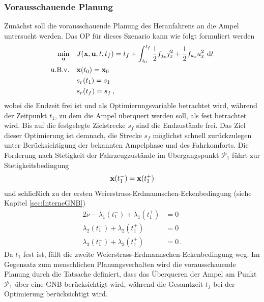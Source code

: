 \subsubsection{Vorausschauende Planung}\label{subsubsec:Vorausschauend}
Zunächst soll die vorausschauende Planung des Heranfahrens an die Ampel untersucht werden. Das \gls{OP} für dieses Szenario kann wie folgt formuliert werden
\begin{align}
\min_{\boldsymbol{\mathrm{u}}} \quad & J(\boldsymbol{\mathrm{x}},\boldsymbol{\mathrm{u}},t,t_f) = t_f + \int_{t_0}^{t_f}\frac{1}{2}f_{j_x} j_x^2 + \frac{1}{2}f_{a_x} a_x^2~\textrm{d}{t} \\
\textrm{u.B.v.} \quad& \boldsymbol{\mathrm{x}}(t_0) = \boldsymbol{\mathrm{x}}_0 \\
& s_r(t_1) = s_1 \label{eq:srt1_gleich_s1}\\
& s_r(t_f ) = s_f\,,
\end{align}
wobei die Endzeit frei ist und als Optimierungsvariable betrachtet wird, während der Zeitpunkt $t_1$, zu dem die Ampel überquert werden soll, als fest betrachtet wird. Bis auf die festgelegte Zielstrecke $s_f$ sind die Endzustände frei. Das Ziel dieser Optimierung ist demnach, die Strecke $s_f$ möglichst schnell zurückzulegen unter Berücksichtigung der bekannten Ampelphase und des Fahrkomforts. Die Forderung nach Stetigkeit der Fahrzeugzustände im Übergangspunkt $\mathcal{P}_1$ führt zur Stetigkeitsbedingung 
\begin{equation}
\boldsymbol{\mathrm{x}}(t_1^-) = \boldsymbol{\mathrm{x}}(t_1^+)
\end{equation}
und schließlich zu der ersten Weierstrass-Erdmannschen-Eckenbedingung (siehe Kapitel \ref{sec:InterneGNB})
\begin{align}
2\tilde{\nu} - \lambda_1(t_1^-) + \lambda_1(t_1^+) &= 0\\
\lambda_2(t_1^-) + \lambda_2(t_1^+) &= 0\\
\lambda_3(t_1^-) + \lambda_3(t_1^+) &= 0\,. \label{eq:l3tminus_l3tplus}
\end{align}
Da $t_1$ fest ist, fällt die zweite Weierstrass-Erdmannschen-Eckenbedingung weg. Im Gegensatz zum menschlichen Planungsverhalten wird die vorausschauende Planung durch die Tatsache definiert, dass das Überqueren der Ampel am Punkt $\mathcal{P}_1$ über eine \gls{GNB} berücksichtigt wird, während die Gesamtzeit $t_f$ bei der Optimierung berücksichtigt wird.

